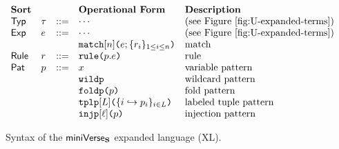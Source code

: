 {{{{\begin{figure}
\[\begin{array}{lllllll}
\textbf{Sort} & & 
& \textbf{Operational Form} 
& \textbf{Description}\\
\mathsf{Typ} & \tau & ::= 
& \cdots
& \text{(see Figure \ref{fig:U-expanded-terms})}\\
\mathsf{Exp} & e & ::= 
& \cdots 
& \text{(see Figure \ref{fig:U-expanded-terms})}\\
&&
& \aematchwith{n}{e}{\seqschemaX{r}}
& \text{match}\\
\mathsf{Rule} & r & ::= 
& \aematchrule{p}{e} 
& \text{rule}\\
\mathsf{Pat} & p & ::= 
& x  
& \text{variable pattern}\\
&&& \aewildp 
& \text{wildcard pattern}\\
&&& \aefoldp{p} 
& \text{fold pattern}\\
&&& \aetplp{\labelset}{\mapschema{p}{i}{\labelset}} 
& \text{labeled tuple pattern}\\
&&& \aeinjp{\ell}{p} 
& \text{injection pattern} %
\end{array}\]
\caption{Syntax of the $\mathsf{miniVerse}_\textbf{S}$ expanded language (XL).}
\label{fig:UP-expanded-terms}
\end{figure}


}}}}
